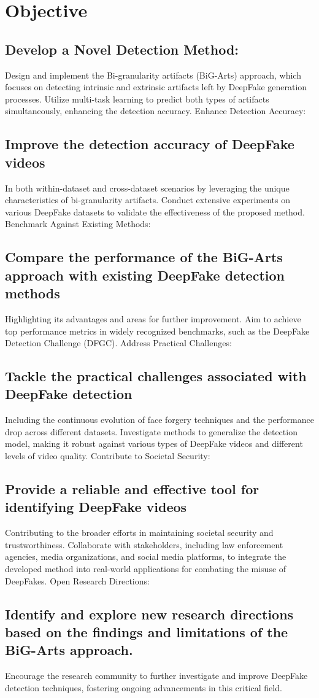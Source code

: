 \section{Objective}
\large
\subsection{Develop a Novel Detection Method:}
Design and implement the Bi-granularity artifacts (BiG-Arts) approach, which focuses on detecting intrinsic and extrinsic artifacts left by DeepFake generation processes.
Utilize multi-task learning to predict both types of artifacts simultaneously, enhancing the detection accuracy.
Enhance Detection Accuracy:
\subsection{Improve the detection accuracy of DeepFake videos}
 In both within-dataset and cross-dataset scenarios by leveraging the unique characteristics of bi-granularity artifacts.
Conduct extensive experiments on various DeepFake datasets to validate the effectiveness of the proposed method.
Benchmark Against Existing Methods:
\subsection{Compare the performance of the BiG-Arts approach with existing DeepFake detection methods}
Highlighting its advantages and areas for further improvement.
Aim to achieve top performance metrics in widely recognized benchmarks, such as the DeepFake Detection Challenge (DFGC).
Address Practical Challenges:
\subsection{Tackle the practical challenges associated with DeepFake detection}
Including the continuous evolution of face forgery techniques and the performance drop across different datasets.
Investigate methods to generalize the detection model, making it robust against various types of DeepFake videos and different levels of video quality.
Contribute to Societal Security:
\subsection{Provide a reliable and effective tool for identifying DeepFake videos}
Contributing to the broader efforts in maintaining societal security and trustworthiness.
Collaborate with stakeholders, including law enforcement agencies, media organizations, and social media platforms, to integrate the developed method into real-world applications for combating the misuse of DeepFakes.
Open Research Directions:
\subsection{Identify and explore new research directions based on the findings and limitations of the BiG-Arts approach.}

Encourage the research community to further investigate and improve DeepFake detection techniques, fostering ongoing advancements in this critical field.